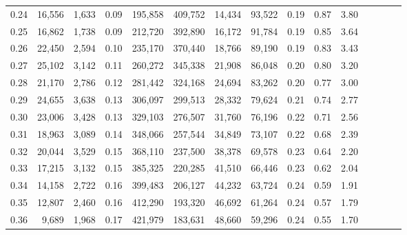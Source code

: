 \begin{tabular}{rrrcrrrrrrrrrrr}
0.24 &  16,556 &   1,633 &                                       0.09 &  195,858 &  409,752 &   14,434 &   93,522 &  0.19 &  0.87 &                         3.80 \\
0.25 &  16,862 &   1,738 &                                       0.09 &  212,720 &  392,890 &   16,172 &   91,784 &  0.19 &  0.85 &                         3.64 \\
0.26 &  22,450 &   2,594 &                                       0.10 &  235,170 &  370,440 &   18,766 &   89,190 &  0.19 &  0.83 &                         3.43 \\
0.27 &  25,102 &   3,142 &                                       0.11 &  260,272 &  345,338 &   21,908 &   86,048 &  0.20 &  0.80 &                         3.20 \\
0.28 &  21,170 &   2,786 &                                       0.12 &  281,442 &  324,168 &   24,694 &   83,262 &  0.20 &  0.77 &                         3.00 \\
0.29 &  24,655 &   3,638 &                                       0.13 &  306,097 &  299,513 &   28,332 &   79,624 &  0.21 &  0.74 &                         2.77 \\
0.30 &  23,006 &   3,428 &                                       0.13 &  329,103 &  276,507 &   31,760 &   76,196 &  0.22 &  0.71 &                         2.56 \\
0.31 &  18,963 &   3,089 &                                       0.14 &  348,066 &  257,544 &   34,849 &   73,107 &  0.22 &  0.68 &                         2.39 \\
0.32 &  20,044 &   3,529 &                                       0.15 &  368,110 &  237,500 &   38,378 &   69,578 &  0.23 &  0.64 &                         2.20 \\
0.33 &  17,215 &   3,132 &                                       0.15 &  385,325 &  220,285 &   41,510 &   66,446 &  0.23 &  0.62 &                         2.04 \\
0.34 &  14,158 &   2,722 &                                       0.16 &  399,483 &  206,127 &   44,232 &   63,724 &  0.24 &  0.59 &                         1.91 \\
0.35 &  12,807 &   2,460 &                                       0.16 &  412,290 &  193,320 &   46,692 &   61,264 &  0.24 &  0.57 &                         1.79 \\
0.36 &   9,689 &   1,968 &                                       0.17 &  421,979 &  183,631 &   48,660 &   59,296 &  0.24 &  0.55 &                         1.70 \\

\end{tabular}
